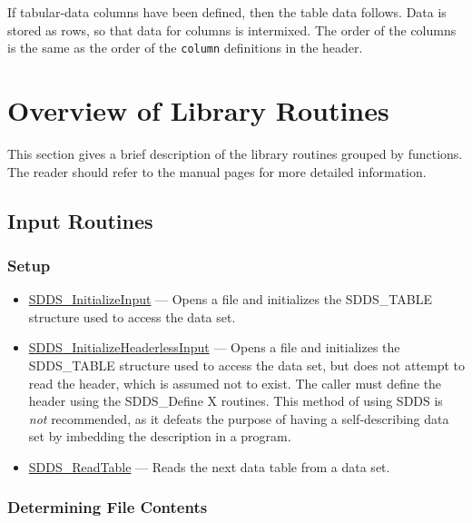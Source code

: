 \documentclass[11pt]{article}
\newcommand{\progref}[1]{\hyperref{SDDS_#1}{{\tt SDDS\_#1} (}{)}{SDDS_#1}}
\begin{document}
If tabular-data columns have been defined, then the table data follows.
Data is stored as rows, so that data for columns is intermixed.  The
order of the columns is the same as the order of the {\tt column} definitions
in the header.

\section{Overview of Library Routines}
This section gives a brief description of the library routines grouped by functions. The reader should refer to the manual pages for more detailed information. 
\subsection{Input Routines}
\subsubsection{Setup}

\begin{itemize}
\item \progref{InitializeInput} --- Opens a file and initializes the SDDS\_TABLE structure used to access the data set.
\item \progref{InitializeHeaderlessInput} --- Opens a file and initializes the SDDS\_TABLE structure used to access the data set, but does not attempt to read the header, which is assumed not to exist. The caller must define the header using the SDDS\_Define X routines. This method of using SDDS is {\em not} recommended, as it defeats the purpose of having a self-describing data set by imbedding the description in a program.
\item \progref{ReadTable} --- Reads the next data table from a data set. 
\end{itemize}

\subsubsection{Determining File Contents}
\end{document}
